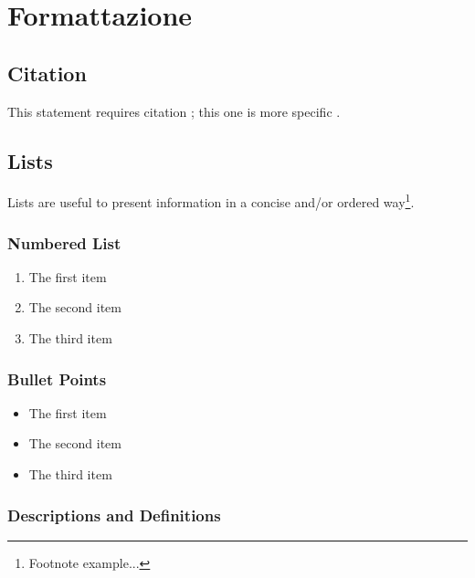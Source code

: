 
\chapter{Formattazione}

\section{Citation}

This statement requires citation \cite{article_key}; this one is more specific \cite[162]{book_key}.


\section{Lists}

Lists are useful to present information in a concise and/or ordered way\footnote{Footnote example...}.

\subsection{Numbered List}

\begin{enumerate}
	\item The first item
	\item The second item
	\item The third item
\end{enumerate}

\subsection{Bullet Points}

\begin{itemize}
	\item The first item
	\item The second item
	\item The third item
\end{itemize}

\subsection{Descriptions and Definitions}

